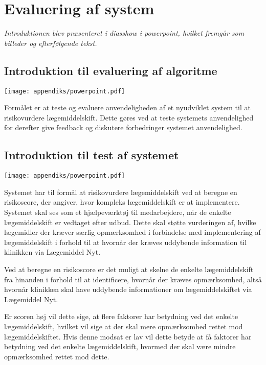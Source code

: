 \chapter{Evaluering af system} \vspace{-1cm} \label{App:Intro}
\textit{Introduktionen blev præsenteret i diasshow i powerpoint, hvilket fremgår som billeder og efterfølgende tekst.}

\section{Introduktion til evaluering af algoritme}  \vspace{-0.3cm}
 \texttt{[image: appendiks/powerpoint.pdf]} \\ \vspace{-3cm} 
  
Formålet er at teste og evaluere anvendeligheden af et nyudviklet system til at risikovurdere lægemiddelskift. Dette gøres ved at teste systemets anvendelighed for derefter give feedback og diskutere forbedringer systemet anvendelighed.

\section{Introduktion til test af systemet} \vspace{-0.3cm}
\texttt{[image: appendiks/powerpoint.pdf]} 

Systemet har til formål at risikovurdere lægemiddelskift ved at beregne en risikoscore, der angiver, hvor kompleks lægemiddelskift er at implementere. Systemet skal ses som et hjælpeværktøj til medarbejdere, når de enkelte lægemiddelskift er vedtaget efter udbud.  Dette skal støtte vurderingen af, hvilke lægemidler der kræver særlig opmærksomhed i forbindelse med implementering af lægemiddelskift i forhold til at hvornår der kræves uddybende information til klinikken via Lægemiddel Nyt. 

Ved at beregne en risikoscore er det muligt at skelne de enkelte lægemiddelskift fra hinanden i forhold til at identificere, hvornår der kræves opmærksomhed, altså hvornår klinikken skal have uddybende informationer om lægemiddelskiftet via Lægemiddel Nyt.

Er scoren høj vil dette sige, at flere faktorer har betydning ved det enkelte lægemiddelskift, hvilket vil sige at der skal mere opmærksomhed rettet mod lægemiddelskiftet. Hvis denne modsat er lav vil dette betyde at få faktorer har betydning ved det enkelte lægemiddelskift, hvormed der skal være mindre opmærksomhed rettet mod dette.

